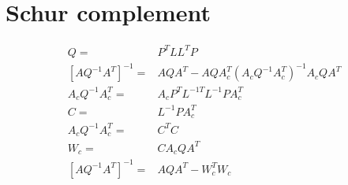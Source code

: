 \documentclass[12pt]{article}
\begin{document}
\section{Schur complement}

\begin{align*}
Q = & P^T L L^T P\\
\left[ A Q^{-1} A^T   \right]^{-1}= &A Q A^T - A Q A_c^T ( A_c Q^{-1} A_c^T )^{-1}  A_c Q A^T\\
 A_c Q^{-1} A_c^T
 = &A_c P^T L^{-1 T} L^{-1} P A_c^T\\
 C = & L^{-1} P A_c^T\\
 A_c Q^{-1} A_c^T =& C^T C\\
W_c = & C A_c Q A^T\\
\left[A Q^{-1} A^T  \right]^{-1} = &A Q A^T - W_c^T W_c 
\end{align*}


\end{document}
